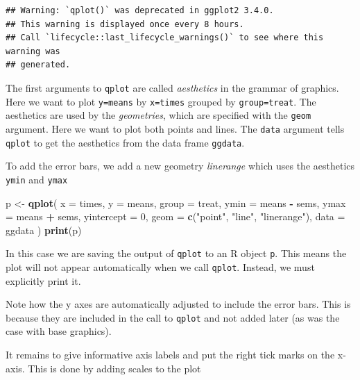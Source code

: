 \documentclass[
]{book}
\newenvironment{Shaded}{\begin{snugshade}}{\end{snugshade}}
\newcommand{\AttributeTok}[1]{\textcolor[rgb]{0.13,0.29,0.53}{#1}}
\newcommand{\DecValTok}[1]{\textcolor[rgb]{0.00,0.00,0.81}{#1}}
\newcommand{\FunctionTok}[1]{\textcolor[rgb]{0.13,0.29,0.53}{\textbf{#1}}}
\newcommand{\NormalTok}[1]{#1}
\newcommand{\OtherTok}[1]{\textcolor[rgb]{0.56,0.35,0.01}{#1}}
\newcommand{\SpecialCharTok}[1]{\textcolor[rgb]{0.81,0.36,0.00}{\textbf{#1}}}
\newcommand{\StringTok}[1]{\textcolor[rgb]{0.31,0.60,0.02}{#1}}
\begin{document}
\begin{verbatim}
## Warning: `qplot()` was deprecated in ggplot2 3.4.0.
## This warning is displayed once every 8 hours.
## Call `lifecycle::last_lifecycle_warnings()` to see where this warning was
## generated.
\end{verbatim}

The first arguments to \texttt{qplot} are called \emph{aesthetics} in the
grammar of graphics. Here we want to plot \texttt{y=means} by
\texttt{x=times} grouped by \texttt{group=treat}. The aesthetics
are used by the \emph{geometries}, which are specified with the
\texttt{geom} argument. Here we want to plot both points and
lines. The \texttt{data} argument tells \texttt{qplot} to get the
aesthetics from the data frame \texttt{ggdata}.

To add the error bars, we add a new geometry \emph{linerange} which uses
the aesthetics \texttt{ymin} and \texttt{ymax}

\begin{Shaded}
\begin{Highlighting}[]
\NormalTok{p }\OtherTok{\textless{}{-}} \FunctionTok{qplot}\NormalTok{(}
  \AttributeTok{x =}\NormalTok{ times, }\AttributeTok{y =}\NormalTok{ means, }\AttributeTok{group =}\NormalTok{ treat,}
  \AttributeTok{ymin =}\NormalTok{ means }\SpecialCharTok{{-}}\NormalTok{ sems, }\AttributeTok{ymax =}\NormalTok{ means }\SpecialCharTok{+}\NormalTok{ sems,}
  \AttributeTok{yintercept =} \DecValTok{0}\NormalTok{, }\AttributeTok{geom =} \FunctionTok{c}\NormalTok{(}\StringTok{"point"}\NormalTok{, }\StringTok{"line"}\NormalTok{, }\StringTok{"linerange"}\NormalTok{),}
  \AttributeTok{data =}\NormalTok{ ggdata}
\NormalTok{)}
\FunctionTok{print}\NormalTok{(p)}
\end{Highlighting}
\end{Shaded}

In this case we are saving the output of \texttt{qplot} to an R
object \texttt{p}. This means the plot will not appear automatically
when we call \texttt{qplot}. Instead, we must explicitly print it.

Note how the y axes are automatically adjusted to include the error
bars. This is because they are included in the call to \texttt{qplot}
and not added later (as was the case with base graphics).

It remains to give informative axis labels and put the right tick
marks on the x-axis. This is done by adding scales to the plot

\begin{Shaded}
\end{Shaded}
\end{document}
